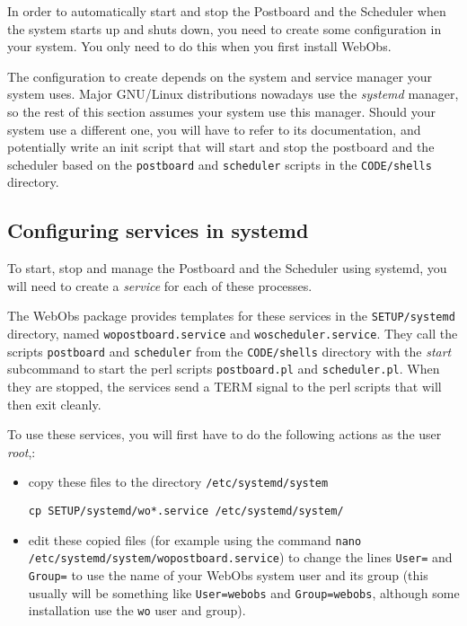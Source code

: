 In order to automatically start and stop the Postboard and the Scheduler when
the system starts up and shuts down, you need to create some configuration in
your system. You only need to do this when you first install WebObs.

The configuration to create depends on the system and service manager your
system uses. Major GNU/Linux distributions nowadays use the \textit{systemd}
manager, so the rest of this section assumes your system use this manager.
Should your system use a different one, you will have to refer to its
documentation, and potentially write an init script that will start and stop
the postboard and the scheduler based on the \texttt{postboard} and
\texttt{scheduler} scripts in the \texttt{CODE/shells} directory.

\subsection*{Configuring services in systemd}

To start, stop and manage the Postboard and the Scheduler using systemd, you
will need to create a \textit{service} for each of these processes.

The WebObs package provides templates for these services in the
\texttt{SETUP/systemd} directory, named \texttt{wopostboard.service} and
\texttt{woscheduler.service}. They call the scripts \texttt{postboard} and
\texttt{scheduler} from the \texttt{CODE/shells} directory with the
\textit{start} subcommand to start the perl scripts \texttt{postboard.pl} and
\texttt{scheduler.pl}. When they are stopped, the services send a TERM signal
to the perl scripts that will then exit cleanly.

To use these services, you will first have to do the following actions as the
user \textit{root},:
\begin{itemize}
	\item copy these files to the directory \texttt{/etc/systemd/system}
	\begin{lstlisting}[style=console]
cp SETUP/systemd/wo*.service /etc/systemd/system/
	\end{lstlisting}
	\item edit these copied files (for example using the command \texttt{nano
		/etc/systemd/system/wopostboard.service}) to change the lines
		\texttt{User=} and \texttt{Group=} to use the name of your WebObs
		system user and its group (this usually will be something like
		\texttt{User=webobs} and \texttt{Group=webobs}, although some
		installation use the \texttt{wo} user and group).
\end{itemize}

